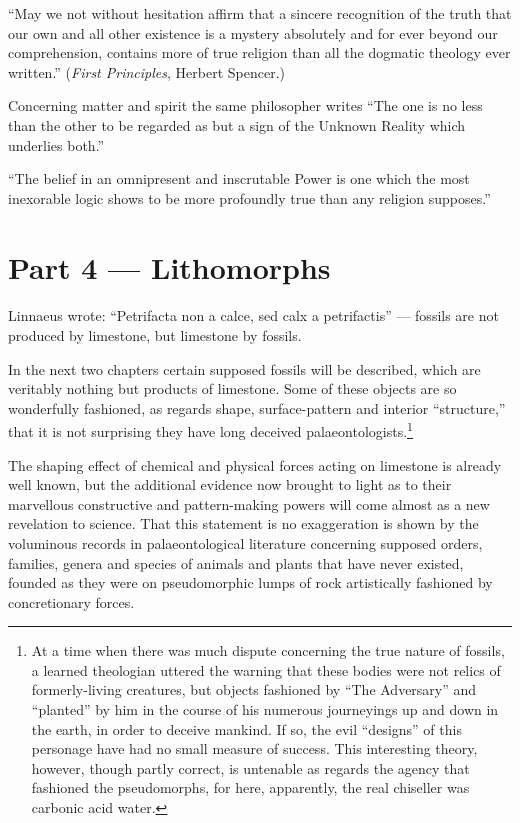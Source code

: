 \documentclass[a4paper, 12pt, oneside]{article}
\begin{document}
``May we not without hesitation affirm that a sincere recognition of the truth that our own and all other existence is a mystery absolutely and for ever beyond our comprehension, contains more of true religion than all the dogmatic theology ever written.'' (\emph{First Principles}, Herbert Spencer.)

Concerning matter and spirit the same philosopher writes ``The one is no less than the other to be regarded as but a sign of the Unknown Reality which underlies both.''

``The belief in an omnipresent and inscrutable Power is one which the most inexorable logic shows to be more profoundly true than any religion supposes.''
\clearpage
\section{Part 4 --- Lithomorphs}
\paragraph{}
Linnaeus wrote: ``Petrifacta non a calce, sed calx a petrifactis'' --- fossils are not produced by limestone, but limestone by fossils.

In the next two chapters certain supposed fossils will be described, which are veritably nothing but products of limestone. Some of these objects are so wonderfully fashioned, as regards shape, surface-pattern and interior ``structure,'' that it is not surprising they have long deceived palaeontologists.\footnote{At a time when there was much dispute concerning the true nature of fossils, a learned theologian uttered the warning that these bodies were not relics of formerly-living creatures, but objects fashioned by ``The Adversary'' and ``planted'' by him in the course of his numerous journeyings up and down in the earth, in order to deceive mankind. If so, the evil ``designs'' of this personage have had no small measure of success. This interesting theory, however, though partly correct, is untenable as regards the agency that fashioned the pseudomorphs, for here, apparently, the real chiseller was carbonic acid water.}

The shaping effect of chemical and physical forces acting on limestone is already well known, but the additional evidence now brought to light as to their marvellous constructive and pattern-making powers will come almost as a new revelation to science. That this statement is no exaggeration is shown by the voluminous records in palaeontological literature concerning supposed orders, families, genera and species of animals and plants that have never existed, founded as they were on pseudomorphic lumps of rock artistically fashioned by concretionary forces.
\end{document}
